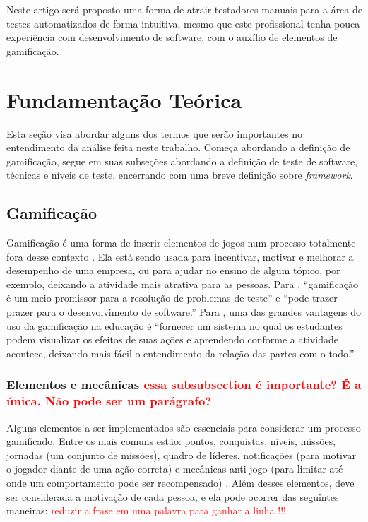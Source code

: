 \documentclass[twoside,english,brazilian]{UNISINOSartigo}
\begin{document}
Neste artigo será proposto uma forma de atrair testadores manuais para a área de testes automatizados de forma intuitiva, mesmo que este profissional tenha pouca experiência com desenvolvimento de software, com o auxílio de elementos de gamificação.


 


\section{Fundamentação Teórica}

Esta seção visa abordar alguns dos termos que serão importantes no entendimento da análise feita neste trabalho. Começa abordando a definição de gamificação, segue em suas subseções abordando a definição de teste de software, técnicas e níveis de teste, encerrando com uma breve definição sobre \textit{framework}.

\subsection{Gamificação}

Gamificação é uma forma de inserir elementos de jogos num processo totalmente fora desse contexto \cite{Dale}. Ela está sendo usada para incentivar, motivar e melhorar a desempenho de uma empresa, ou para ajudar no ensino de algum tópico, por exemplo, deixando a atividade mais atrativa para as pessoas. Para \cite{DeJesus}, ``gamificação é um meio promissor para a resolução de problemas de teste'' e ``pode trazer prazer para o desenvolvimento de software.'' Para \cite{Elgrably}, uma das grandes vantagens do uso da gamificação na educação é ``fornecer um sistema no qual os estudantes podem visualizar os efeitos de suas ações e aprendendo conforme a atividade acontece, deixando mais fácil o entendimento da relação das partes com o todo.'' 


\subsubsection{Elementos e mecânicas \textcolor{red}{essa subsubsection é importante? É a única. Não pode ser um parágrafo?}}

Alguns elementos a ser implementados são essenciais para considerar um processo gamificado. Entre os mais comuns estão: pontos, conquistas, níveis, missões, jornadas (um conjunto de missões), quadro de líderes, notificações (para motivar o jogador diante de uma ação correta) e mecânicas anti-jogo (para limitar até onde um comportamento pode ser recompensado) \cite{Dale}. Além desses elementos, deve ser considerada a motivação de cada pessoa, e ela pode ocorrer das seguintes maneiras: \textcolor{red}{reduzir a frase em uma palavra para ganhar a linha !!!}
\end{document}
